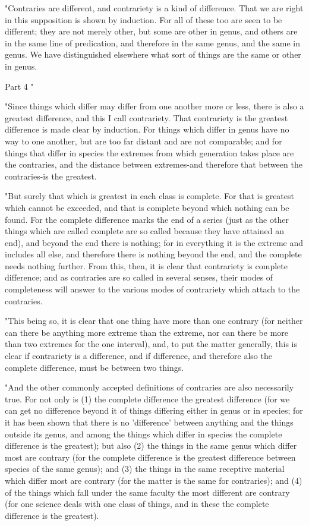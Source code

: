 "Contraries are different, and contrariety is a kind of difference.
That we are right in this supposition is shown by induction. For all
of these too are seen to be different; they are not merely other,
but some are other in genus, and others are in the same line of predication,
and therefore in the same genus, and the same in genus. We have distinguished
elsewhere what sort of things are the same or other in genus.

Part 4 "

"Since things which differ may differ from one another more or less,
there is also a greatest difference, and this I call contrariety.
That contrariety is the greatest difference is made clear by induction.
For things which differ in genus have no way to one another, but are
too far distant and are not comparable; and for things that differ
in species the extremes from which generation takes place are the
contraries, and the distance between extremes-and therefore that between
the contraries-is the greatest. 

"But surely that which is greatest in each class is complete. For
that is greatest which cannot be exceeded, and that is complete beyond
which nothing can be found. For the complete difference marks the
end of a series (just as the other things which are called complete
are so called because they have attained an end), and beyond the end
there is nothing; for in everything it is the extreme and includes
all else, and therefore there is nothing beyond the end, and the complete
needs nothing further. From this, then, it is clear that contrariety
is complete difference; and as contraries are so called in several
senses, their modes of completeness will answer to the various modes
of contrariety which attach to the contraries. 

"This being so, it is clear that one thing have more than one contrary
(for neither can there be anything more extreme than the extreme,
nor can there be more than two extremes for the one interval), and,
to put the matter generally, this is clear if contrariety is a difference,
and if difference, and therefore also the complete difference, must
be between two things. 

"And the other commonly accepted definitions of contraries are also
necessarily true. For not only is (1) the complete difference the
greatest difference (for we can get no difference beyond it of things
differing either in genus or in species; for it has been shown that
there is no 'difference' between anything and the things outside its
genus, and among the things which differ in species the complete difference
is the greatest); but also (2) the things in the same genus which
differ most are contrary (for the complete difference is the greatest
difference between species of the same genus); and (3) the things
in the same receptive material which differ most are contrary (for
the matter is the same for contraries); and (4) of the things which
fall under the same faculty the most different are contrary (for one
science deals with one class of things, and in these the complete
difference is the greatest). 

